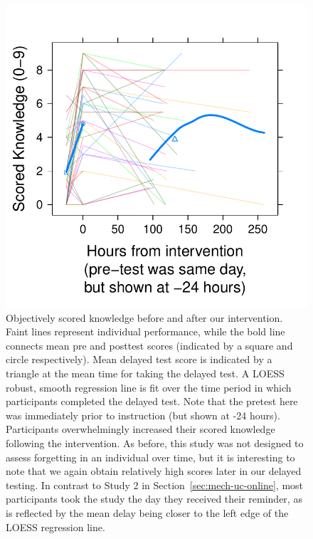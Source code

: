 \begin{figure}
    \centering
    \includegraphics{CCO-mech-scored.pdf}
    \caption{Objectively scored knowledge before and after our intervention.
        Faint lines represent individual performance, while the bold line
        connects mean pre and posttest scores (indicated by a square and circle
        respectively). Mean delayed test score is indicated by a triangle at the
        mean time for taking the delayed test. A LOESS robust, smooth regression
        line is fit over the time period in which participants completed the
        delayed test.  Note that the pretest here was immediately prior to
        instruction (but shown at -24 hours). Participants overwhelmingly
        increased their scored knowledge following the intervention. As before,
        this study was not designed to assess forgetting in an individual over
        time, but it is interesting to note that we again obtain relatively high
        scores later in our delayed testing. In contrast to Study 2 in
        Section~\ref{sec:mech-uc-online}, most participants took the study the
        day they received their reminder, as is reflected by the mean delay
        being closer to the left edge of the LOESS regression line.}
    \label{fig:CCO-mech-scored}
\end{figure}

